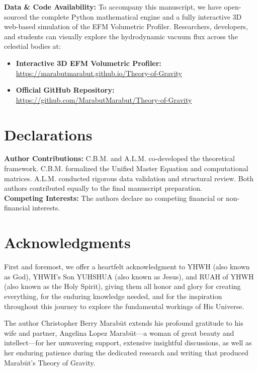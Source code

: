 \documentclass[11pt, a4paper]{article}
\begin{document}
  \vspace{1em}
  \noindent \textbf{Data \& Code Availability:} To accompany this manuscript, we have open-sourced the complete Python mathematical engine and a fully interactive 3D web-based simulation of the EFM Volumetric Profiler. Researchers, developers, and students can visually explore the hydrodynamic vacuum flux across the celestial bodies at: 
  \begin{itemize}
    \item \textbf{Interactive 3D EFM Volumetric Profiler:} \\ \url{https://marabutmarabut.github.io/Theory-of-Gravity}
    \item \textbf{Official GitHub Repository:} \\ \url{https://github.com/MarabutMarabut/Theory-of-Gravity}
  \end{itemize}

\clearpage
\section*{Declarations}
\textbf{Author Contributions:} C.B.M. and A.L.M. co-developed the theoretical framework. C.B.M. formalized the Unified Master Equation and computational matrices. A.L.M. conducted rigorous data validation and structural review. Both authors contributed equally to the final manuscript preparation. \\[0.5em]
\textbf{Competing Interests:} The authors declare no competing financial or non-financial interests.

\section*{Acknowledgments}
First and foremost, we offer a heartfelt acknowledgment to YHWH (also known as God), YHWH's Son YUHSHUA (also known as Jesus), and RUAH of YHWH (also known as the Holy Spirit), giving them all honor and glory for creating everything, for the enduring knowledge needed, and for the inspiration throughout this journey to explore the fundamental workings of His Universe.

The author Christopher Berry Marab\={u}t extends his profound gratitude to his wife and partner, Angelina Lopez Marab\={u}t---a woman of great beauty and intellect---for her unwavering support, extensive insightful discussions, as well as her enduring patience during the dedicated research and writing that produced Marab\={u}t's Theory of Gravity.
\end{document}
